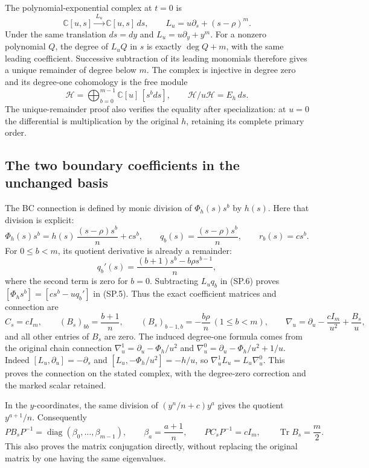 The polynomial-exponential complex at \(t=0\) is
\[
 \mathbb C[u,s]\xrightarrow{\,L_u\,}
 \mathbb C[u,s]\,ds,\qquad
 L_u=u\partial_s+(s-\rho)^m .
 \tag{SP.4}\label{eq:sp-complex}
\]
Under the same translation \(ds=dy\) and \(L_u=u\partial_y+y^m\).
For a nonzero polynomial \(Q\), the degree of \(L_uQ\) in \(s\)
is exactly \(\deg Q+m\), with the same leading coefficient.
Successive subtraction of its leading monomials therefore gives
a unique remainder of degree below \(m\). The complex is injective
in degree zero and its degree-one cohomology is the free module
\[
 \mathcal H=\bigoplus_{b=0}^{m-1}\mathbb C[u]\,[s^bds],
 \qquad
 \mathcal H/u\mathcal H=E_h\,ds .
 \tag{SP.5}\label{eq:sp-lattice}
\]
The unique-remainder proof also verifies the equality after
specialization: at \(u=0\) the differential is multiplication
by the original \(h\), retaining its complete primary order.

\subsection{The two boundary coefficients in the unchanged basis}

The BC connection is defined by monic division of
\(\Phi_h(s)s^b\) by \(h(s)\). Here that division is explicit:
\[
 \Phi_h(s)s^b
   =h(s)\,\frac{(s-\rho)s^b}{n}+cs^b,\qquad
 q_b(s)=\frac{(s-\rho)s^b}{n},\qquad r_b(s)=cs^b .
 \tag{SP.6}\label{eq:sp-division}
\]
For \(0\le b<m\), its quotient derivative is already a remainder:
\[
 q_b'(s)=\frac{(b+1)s^b-b\rho s^{b-1}}{n},
 \tag{SP.7}\label{eq:sp-Bcolumn}
\]
where the second term is zero for \(b=0\).
Subtracting \(L_uq_b\) in (SP.6) proves
\([\Phi_hs^b]=[cs^b-uq_b']\) in (SP.5).
Thus the exact coefficient matrices and connection are
\[
 C_s=cI_m,\qquad
 (B_s)_{bb}=\frac{b+1}{n},\qquad
 (B_s)_{b-1,b}=-\frac{b\rho}{n}\ (1\le b<m),\qquad
 \nabla_u=\partial_u-\frac{cI_m}{u^2}+\frac{B_s}{u},
 \tag{SP.8}\label{eq:sp-connection}
\]
and all other entries of \(B_s\) are zero.
The induced degree-one formula comes from the original chain
connection
\(\nabla_u^1=\partial_u-\Phi_h/u^2\) and
\(\nabla_u^0=\partial_u-\Phi_h/u^2+1/u\).
Indeed
\([L_u,\partial_u]=-\partial_s\) and
\([L_u,-\Phi_h/u^2]=-h/u\), so
\(\nabla_u^1L_u=L_u\nabla_u^0\).
This proves the connection on the stated complex, with the
degree-zero correction and the marked scalar retained.

In the \(y\)-coordinates, the same division of
\((y^n/n+c)y^a\) gives the quotient \(y^{a+1}/n\).
Consequently
\[
 PB_sP^{-1}=\operatorname{diag}(\beta_0,\ldots,\beta_{m-1}),
 \qquad \beta_a=\frac{a+1}{n},\qquad
 PC_sP^{-1}=cI_m,\qquad \operatorname{Tr}B_s=\frac m2.
 \tag{SP.9}\label{eq:sp-diagonal}
\]
This also proves the matrix conjugation directly, without replacing
the original matrix by one having the same eigenvalues.

